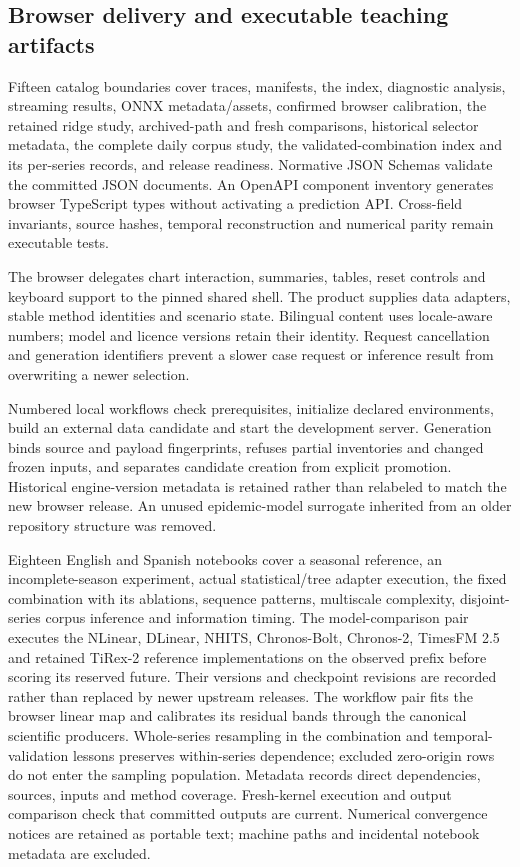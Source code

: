 \documentclass[11pt,a4paper]{article}
\begin{document}
\subsection{Browser delivery and executable teaching artifacts}
Fifteen catalog boundaries cover traces, manifests, the index, diagnostic analysis, streaming results, ONNX metadata/assets, confirmed browser calibration, the retained ridge study, archived-path and fresh comparisons, historical selector metadata, the complete daily corpus study, the validated-combination index and its per-series records, and release readiness. Normative JSON Schemas validate the committed JSON documents. An OpenAPI component inventory generates browser TypeScript types without activating a prediction API. Cross-field invariants, source hashes, temporal reconstruction and numerical parity remain executable tests.

The browser delegates chart interaction, summaries, tables, reset controls and keyboard support to the pinned shared shell. The product supplies data adapters, stable method identities and scenario state. Bilingual content uses locale-aware numbers; model and licence versions retain their identity. Request cancellation and generation identifiers prevent a slower case request or inference result from overwriting a newer selection.

Numbered local workflows check prerequisites, initialize declared environments, build an external data candidate and start the development server. Generation binds source and payload fingerprints, refuses partial inventories and changed frozen inputs, and separates candidate creation from explicit promotion. Historical engine-version metadata is retained rather than relabeled to match the new browser release. An unused epidemic-model surrogate inherited from an older repository structure was removed.

Eighteen English and Spanish notebooks cover a seasonal reference, an incomplete-season experiment, actual statistical/tree adapter execution, the fixed combination with its ablations, sequence patterns, multiscale complexity, disjoint-series corpus inference and information timing. The model-comparison pair executes the NLinear, DLinear, NHITS, Chronos-Bolt, Chronos-2, TimesFM 2.5 and retained TiRex-2 reference implementations on the observed prefix before scoring its reserved future. Their versions and checkpoint revisions are recorded rather than replaced by newer upstream releases. The workflow pair fits the browser linear map and calibrates its residual bands through the canonical scientific producers. Whole-series resampling in the combination and temporal-validation lessons preserves within-series dependence; excluded zero-origin rows do not enter the sampling population. Metadata records direct dependencies, sources, inputs and method coverage. Fresh-kernel execution and output comparison check that committed outputs are current. Numerical convergence notices are retained as portable text; machine paths and incidental notebook metadata are excluded.
\end{document}
